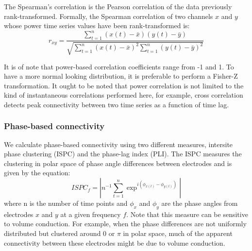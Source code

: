 \documentclass[11pt, onecolumn]{article}
\begin{document}
The Spearman's correlation is the Pearson correlation of the data previously rank-transformed. Formally, the Spearman correlation of two channels $x$ and $y$ whose power time series values have been rank-transformed is:
\begin{equation}
r_{xy} = \frac{\sum_{t=1}^{n}(x(t) - \bar{x})(y(t) - \bar{y})}{\sqrt{{\sum_{t=1}^{n}(x(t) - \bar{x})^2}{\sum_{t=1}^{n}(y(t) - \bar{y})^2}}}
\label{eq:pears}
\end{equation}

It is of note that power-based correlation coefficients range from -1 and 1. To have a more normal looking distribution, it is preferable to perform a Fisher-Z transformation. It ought to be noted that power correlation is not limited to the kind of instantaneous correlations performed here, for example, cross correlation detects peak connectivity between two time series as a function of time lag.

\subsubsection{Phase-based connectivity}
We calculate phase-based connectivity using two different measures, intersite phase clustering (ISPC) and the phase-lag index (PLI). 
The ISPC measures the clustering in polar space of phase angle differences between electrodes and is given by the equation:
\begin{equation}
ISPC_f = | n^{-1} \sum_{t=1}^{n} \exp ^{i(\phi_{x(t)} -\phi_{y(t)})}|
\label{eq:ispc}
\end{equation}
where n is the number of time points and $\phi_x$ and $\phi_y$ are the phase angles from electrodes $x$ and $y$ at a given frequency $f$. Note that this measure can be sensitive to volume conduction. For example, when the phase differences are not uniformly distributed but clustered around 0 or $\pi$ in polar space, much of the apparent connectivity between these electrodes might be due to volume conduction.
\end{document}
